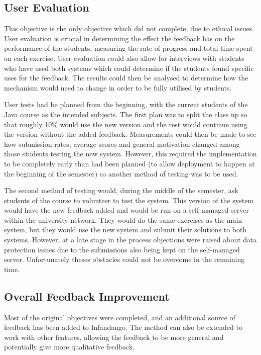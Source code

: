 \subsection{User Evaluation}
This objective is the only objective which did not complete, due to ethical issues. User evaluation is crucial in determining the effect the feedback has on the performance of the students, measuring the rate of progress and total time spent on each exercise. User evaluation could also allow for interviews with students who have used both systems which could determine if the students found specific uses for the feedback. The results could then be analysed to determine how the mechanism would need to change in order to be fully utilised by students.

User tests had be planned from the beginning, with the current students of the Java course as the intended subjects. The first plan was to split the class up so that roughly 10\% would use the new version and the rest would continue using the version without the added feedback. Measurements could then be made to see how submission rates, average scores and general motivation changed among those students testing the new system. However, this required the implementation to be completely early than had been planned (to allow deployment to happen at the beginning of the semester) so another method of testing was to be used.

The second method of testing would, during the middle of the semester, ask students of the course to volunteer to test the system. This version of the system would have the new feedback added and would be run on a self-managed server within the university network. They would do the same exercises as the main system, but they would use the new system and submit their solutions to both systems. However, at a late stage in the process objections were raised about data protection issues due to the submissions also being kept on the self-managed server. Unfortunately theses obstacles could not be overcome in the remaining time.

\subsection{Overall Feedback Improvement}
Most of the original objectives were completed, and an additional source of feedback has been added to Infandango. The method can also be extended to work with other features, allowing the feedback to be more general and potentially give more qualitative feedback. 

